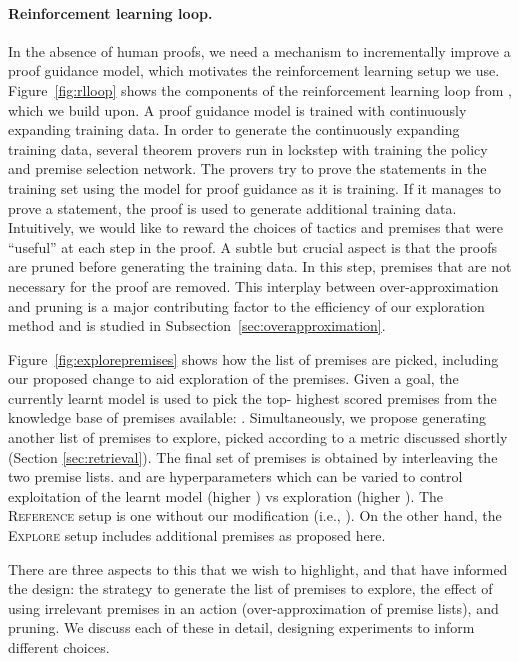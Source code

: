 \documentclass{article}
\begin{document}
\paragraph{Reinforcement learning loop.}
In the absence of human proofs, we need a mechanism to incrementally improve a proof guidance model, which motivates the reinforcement learning setup we use.
Figure~\ref{fig:rlloop} shows the components of the reinforcement learning loop from \cite{bansal2019holist}, which we build upon.
A proof guidance model is trained with continuously expanding training data.
In order to generate the continuously expanding training data, several theorem provers run in lockstep with training the policy and premise selection network.
The provers try to prove the statements in the training set using the model for proof guidance as it is training.
If it manages to prove a statement, the proof is used to generate additional training data.
Intuitively, we would like to reward the choices of tactics and premises that were ``useful'' at each step in the proof.
A subtle but crucial aspect is that the proofs are pruned before generating the training data.
In this step, premises that are not necessary for the proof are removed. 
This interplay between over-approximation and pruning is a major contributing factor to the efficiency of our exploration method and is studied in Subsection~\ref{sec:overapproximation}.

Figure~\ref{fig:explorepremises} shows how the list of premises are picked, including our proposed change to aid exploration of the premises.
Given a goal, the currently learnt model is used to pick the top- highest scored premises from the knowledge base of premises available: .
Simultaneously, we propose generating another list of premises  to explore, picked according to a metric discussed shortly (Section \ref{sec:retrieval}).
The final set of premises is obtained by interleaving the two premise lists.
 and  are hyperparameters which can be varied to control exploitation of the learnt model (higher ) vs exploration (higher ). The \textsc{Reference} setup is one without our modification
(i.e., ).
On the other hand, the \textsc{Explore} setup includes additional premises as proposed here.

There are three aspects to this that we wish to highlight, and that have informed the design: the strategy to generate the list of premises to explore, the effect of using irrelevant premises in an action (over-approximation of premise lists), and pruning. We discuss each of these in detail, designing experiments to inform different choices.
\end{document}
